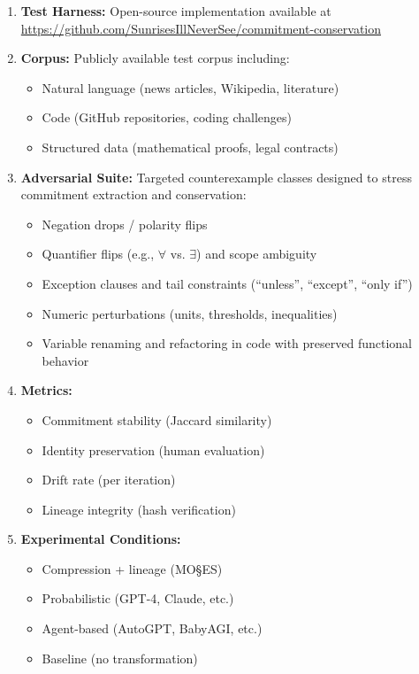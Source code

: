 \documentclass[11pt,a4paper]{article}
\begin{document}
\begin{enumerate}
    \item \textbf{Test Harness:} Open-source implementation available at\\
    \url{https://github.com/SunrisesIllNeverSee/commitment-conservation}

    \item \textbf{Corpus:} Publicly available test corpus including:
    \begin{itemize}
        \item Natural language (news articles, Wikipedia, literature)
        \item Code (GitHub repositories, coding challenges)
        \item Structured data (mathematical proofs, legal contracts)
    \end{itemize}

    \item \textbf{Adversarial Suite:} Targeted counterexample classes designed to stress commitment extraction and conservation:
    \begin{itemize}
        \item Negation drops / polarity flips
        \item Quantifier flips (e.g., $\forall$ vs. $\exists$) and scope ambiguity
        \item Exception clauses and tail constraints (``unless'', ``except'', ``only if'')
        \item Numeric perturbations (units, thresholds, inequalities)
        \item Variable renaming and refactoring in code with preserved functional behavior
    \end{itemize}

    \item \textbf{Metrics:}
    \begin{itemize}
        \item Commitment stability (Jaccard similarity)
        \item Identity preservation (human evaluation)
        \item Drift rate (per iteration)
        \item Lineage integrity (hash verification)
    \end{itemize}

    \item \textbf{Experimental Conditions:}
    \begin{itemize}
        \item Compression + lineage (MO\S{}ES\texttrademark{})
        \item Probabilistic (GPT-4, Claude, etc.)
        \item Agent-based (AutoGPT, BabyAGI, etc.)
        \item Baseline (no transformation)
    \end{itemize}


\end{enumerate}
\end{document}
